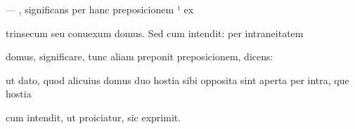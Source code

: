 \fulllines{}

— , significans per hanc preposicionem ¹ ex

trinsecum seu conuexum domus. Sed cum intendit: per intraneitatem

domus, significare, tunc aliam preponit preposicionem, dicens: 




\fullpreviouslines
{
\color{blue}


ut dato, quod alicuius domus duo hostia sibi opposita sint aperta per intra, que hostia%

cum intendit, ut proiciatur, sic exprimit. 

}



